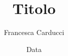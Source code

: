 \documentclass{genera}
\title{Titolo}
\author{Francesca Carducci}
\date{Data}
\begin{document}
\maketitle

\frontmatter

\generaIndice

\mainmatter


\backmatter
\end{document}
